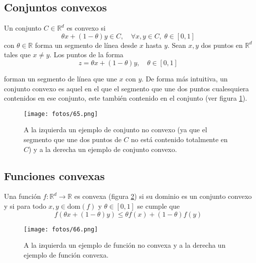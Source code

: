 \subsection{Conjuntos convexos}

\noindent Un conjunto $C \in \mathbb{R}^d$ es convexo si 
\begin{equation}
\theta x + (1 - \theta)y \in C, \quad \forall x, y \in C, \; \theta \in [0, 1]
\end{equation}
con $\theta \in \mathbb{R}$ forma un segmento de línea desde $x$ hasta $y$. Sean $x, y$ dos puntos en $\mathbb{R}^d$ tales que $x \neq y$. Los puntos de la forma 
\begin{equation}
z = \theta x + (1 - \theta)y, \quad \theta \in [0, 1]
\end{equation}

\noindent forman un segmento de línea que une $x$ con $y$. De forma más intuitiva, un conjunto convexo es aquel en el que el segmento que une dos puntos cualesquiera contenidos en ese conjunto, este también contenido en el conjunto (ver figura \ref{fig:conjuntoconvexo}).

\begin{figure}[h]
    \centering
    \texttt{[image: fotos/65.png]}
    \caption{A la izquierda un ejemplo de conjunto no convexo (ya que el segmento que une dos puntos de $C$ no está contenido totalmente en $C$) y a la derecha un ejemplo de conjunto convexo.}
    \label{fig:conjuntoconvexo}
\end{figure}

\subsection{Funciones convexas}

Una función $f: \mathbb{R}^d \to \mathbb{R}$ es convexa (figura \ref{fig:funcionconvexa}) si su dominio es un conjunto convexo y si para todo $x, y \in \text{dom}(f)$ y $\theta \in [0, 1]$ se cumple que
\begin{equation}
f(\theta x + (1 - \theta)y) \leq \theta f(x) + (1 - \theta)f(y)
\end{equation}

\begin{figure}[h]
    \centering
    \texttt{[image: fotos/66.png]}
    \caption{A la izquierda un ejemplo de función no convexa y a la derecha un ejemplo de función convexa.}
    \label{fig:funcionconvexa}
\end{figure}

